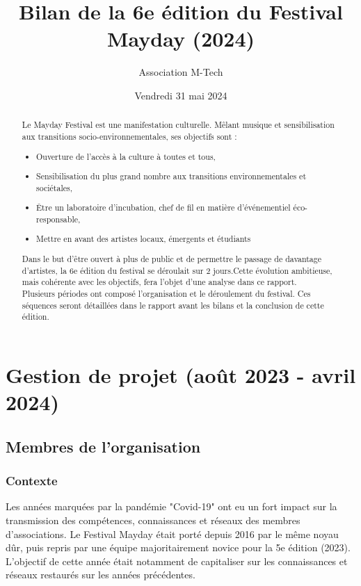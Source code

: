 \documentclass[12pt,a4paper]{report}
\title{Bilan de la 6e édition du Festival Mayday (2024)}
\author{Association M-Tech}
\date{Vendredi 31 mai 2024}
\begin{document}
\maketitle

\begin{abstract}
Le Mayday Festival est une manifestation culturelle. Mêlant musique et sensibilisation aux transitions socio-environnementales, ses objectifs sont :
\begin{itemize}
\item Ouverture de l'accès à la culture à toutes et tous,
\item Sensibilisation du plus grand nombre aux transitions environnementales et sociétales,
\item Être un laboratoire d'incubation, chef de fil en matière d'événementiel éco-responsable,
\item Mettre en avant des artistes locaux, émergents et étudiants
\end{itemize}
Dans le but d'être ouvert à plus de public et de permettre le passage de davantage d'artistes, la 6e édition du festival se déroulait sur 2 jours.Cette évolution ambitieuse, mais cohérente avec les objectifs, fera l'objet d'une analyse dans ce rapport. \\
Plusieurs périodes ont composé l'organisation et le déroulement du festival. Ces séquences seront détaillées dans le rapport avant les bilans et la conclusion de cette édition.
\end{abstract}

\tableofcontents

\part{Gestion de projet (août 2023 - avril 2024)}
\chapter{Membres de l'organisation}
\section{Contexte}
Les années marquées par la pandémie "Covid-19" ont eu un fort impact sur la transmission des compétences, connaissances et réseaux des membres d'associations. Le Festival Mayday était porté depuis 2016 par le même noyau dûr, puis repris par une équipe majoritairement novice pour la 5e édition (2023). L'objectif de cette année était notamment de capitaliser sur les connaissances et réseaux restaurés sur les années précédentes. 
\end{document}
